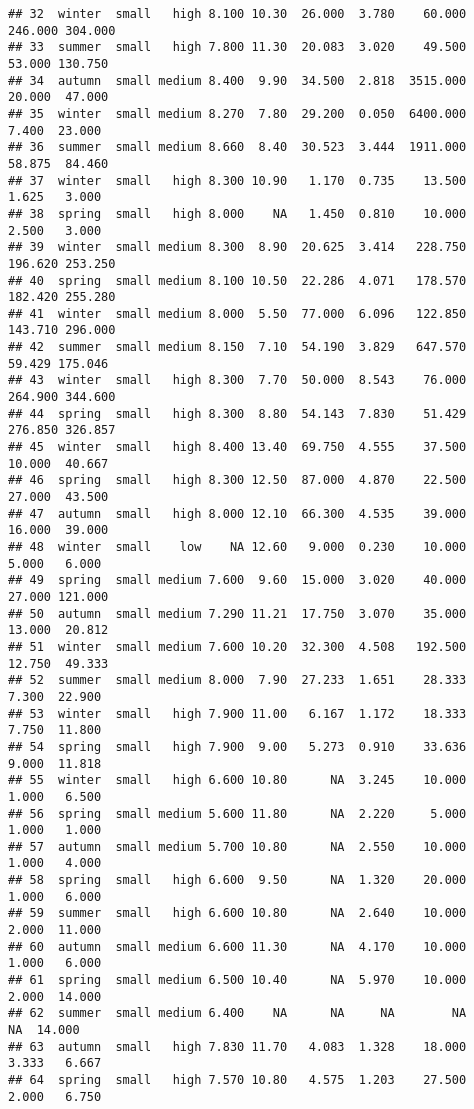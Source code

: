 \documentclass[
]{article}
\begin{document}
\begin{verbatim}
## 32  winter  small   high 8.100 10.30  26.000  3.780    60.000 246.000 304.000
## 33  summer  small   high 7.800 11.30  20.083  3.020    49.500  53.000 130.750
## 34  autumn  small medium 8.400  9.90  34.500  2.818  3515.000  20.000  47.000
## 35  winter  small medium 8.270  7.80  29.200  0.050  6400.000   7.400  23.000
## 36  summer  small medium 8.660  8.40  30.523  3.444  1911.000  58.875  84.460
## 37  winter  small   high 8.300 10.90   1.170  0.735    13.500   1.625   3.000
## 38  spring  small   high 8.000    NA   1.450  0.810    10.000   2.500   3.000
## 39  winter  small medium 8.300  8.90  20.625  3.414   228.750 196.620 253.250
## 40  spring  small medium 8.100 10.50  22.286  4.071   178.570 182.420 255.280
## 41  winter  small medium 8.000  5.50  77.000  6.096   122.850 143.710 296.000
## 42  summer  small medium 8.150  7.10  54.190  3.829   647.570  59.429 175.046
## 43  winter  small   high 8.300  7.70  50.000  8.543    76.000 264.900 344.600
## 44  spring  small   high 8.300  8.80  54.143  7.830    51.429 276.850 326.857
## 45  winter  small   high 8.400 13.40  69.750  4.555    37.500  10.000  40.667
## 46  spring  small   high 8.300 12.50  87.000  4.870    22.500  27.000  43.500
## 47  autumn  small   high 8.000 12.10  66.300  4.535    39.000  16.000  39.000
## 48  winter  small    low    NA 12.60   9.000  0.230    10.000   5.000   6.000
## 49  spring  small medium 7.600  9.60  15.000  3.020    40.000  27.000 121.000
## 50  autumn  small medium 7.290 11.21  17.750  3.070    35.000  13.000  20.812
## 51  winter  small medium 7.600 10.20  32.300  4.508   192.500  12.750  49.333
## 52  summer  small medium 8.000  7.90  27.233  1.651    28.333   7.300  22.900
## 53  winter  small   high 7.900 11.00   6.167  1.172    18.333   7.750  11.800
## 54  spring  small   high 7.900  9.00   5.273  0.910    33.636   9.000  11.818
## 55  winter  small   high 6.600 10.80      NA  3.245    10.000   1.000   6.500
## 56  spring  small medium 5.600 11.80      NA  2.220     5.000   1.000   1.000
## 57  autumn  small medium 5.700 10.80      NA  2.550    10.000   1.000   4.000
## 58  spring  small   high 6.600  9.50      NA  1.320    20.000   1.000   6.000
## 59  summer  small   high 6.600 10.80      NA  2.640    10.000   2.000  11.000
## 60  autumn  small medium 6.600 11.30      NA  4.170    10.000   1.000   6.000
## 61  spring  small medium 6.500 10.40      NA  5.970    10.000   2.000  14.000
## 62  summer  small medium 6.400    NA      NA     NA        NA      NA  14.000
## 63  autumn  small   high 7.830 11.70   4.083  1.328    18.000   3.333   6.667
## 64  spring  small   high 7.570 10.80   4.575  1.203    27.500   2.000   6.750

\end{verbatim}
\end{document}
